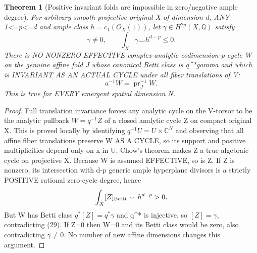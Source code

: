 \documentclass[11pt]{article}
\newtheorem{theorem}{Theorem}
\begin{document}
\begin{theorem}[Positive invariant folds are impossible in zero/negative ample degree]
For arbitrary smooth projective
original X of dimension d,
ANY 1<=p<=d and ample class
$h=c_1(O_X(1))$, let
$\gamma\in H^{2p}(X,\mathbb Q)$
satisfy
\[
 \boxed{
  \gamma\ne0,\qquad
  \int_X\gamma\smile h^{d-p}\le0.
 }                                                       \tag{29}
\]
There is NO NONZERO EFFECTIVE
complex-analytic codimension-p
cycle W on the genuine affine
fold J whose canonical Betti class
is q^*gamma and which is INVARIANT
AS AN ACTUAL CYCLE under all
fiber translations of V:
\[
 \boxed{
  a^{-1}W=\operatorname{pr}_J^{-1}W.
 }                                                       \tag{30}
\]
This is true for EVERY emergent
spatial dimension N.
\end{theorem}
\begin{proof}
Full translation invariance
forces any analytic cycle on
the V-torsor to be the analytic
pullback $W=q^{-1}Z$ of a
closed analytic cycle Z on
compact original X. This is
proved locally by identifying
$q^{-1}U=U\times\mathbb C^N$
and observing that all affine
fiber translations preserve
W AS A CYCLE, so its support
and positive multiplicities
depend only on x in U.
Chow's theorem makes Z a true
algebraic cycle on projective
X. Because W is assumed
EFFECTIVE, so is Z. If Z is
nonzero, its intersection
with d-p generic ample
hyperplane divisors is a
strictly POSITIVE rational
zero-cycle degree, hence
\[
   \int_X [Z]_{\rm Betti}
             \smile h^{d-p}>0.
\]
But W has Betti class
$q^*[Z]=q^*\gamma$ and
q^* is injective, so
$[Z]=\gamma$, contradicting
(29). If Z=0 then W=0
and its Betti class would
be zero, also contradicting
$\gamma\ne0$.
No number of new affine
dimensions changes this argument.
\end{proof}
\end{document}

